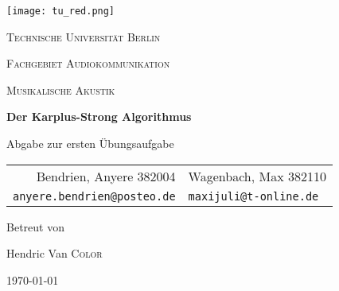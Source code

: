 \begin{titlepage}
    \centering
    \texttt{[image: tu\_red.png]}\par
    {\scshape\huge Technische Universität Berlin \par}
    {\scshape\Large Fachgebiet Audiokommunikation\par}
    \vspace{1.5cm}
    {\scshape\LARGE Musikalische Akustik\par}
    \vspace{1.5cm}

    {\Huge\bfseries {Der Karplus-Strong Algorithmus}\par}
    \vspace{0.1cm}
    {\large Abgabe zur ersten Übungsaufgabe\par}
    \vspace{1cm}

    {\itshape
        \begin{tabular}{rl}
          Bendrien, Anyere 382004 &
          Wagenbach, Max 382110 \\
          \vspace{0.2cm}
          \small \texttt{anyere.bendrien@posteo.de} &
          \small \texttt{maxijuli@t-online.de}
        \end{tabular}
    }
    \vfill
    
    Betreut von\par
    Hendric Van \textsc{Color}
    \vspace{1cm}
    
    {\large \today\par}
\end{titlepage}